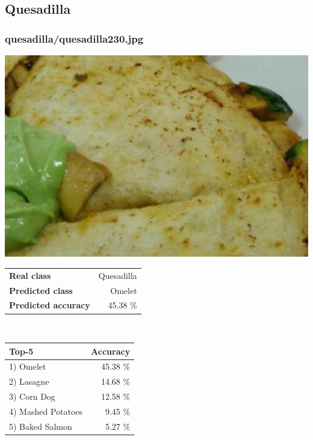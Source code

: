 \subsection{Quesadilla}
    
\subsubsection{quesadilla/quesadilla230.jpg}

\begin{minipage}[t]{0.4\textwidth}
	\vspace{0pt}
	\includegraphics[width=\linewidth]{images/evaluation-images/quesadilla/quesadilla230.jpg}
\end{minipage}
\hfill
\begin{minipage}[t]{0.5\textwidth}
	\vspace{0pt}\raggedright
	\begin{tabularx}{\textwidth}{X r}
		\small \textbf{Real class} & \small Quesadilla\\
		\small \textbf{Predicted class} & \small Omelet\\
		\small \textbf{Predicted accuracy} & \small 45.38 \%
    \end{tabularx}\\
    
    \vspace{6pt}
	\begin{tabularx}{\textwidth}{X r}
        \small \textbf{Top-5} & \small \textbf{Accuracy} \\
        \hline
		\small 1) Omelet & \small 45.38 \%\\\small 2) Lasagne & \small 14.68 \%\\\small 3) Corn Dog & \small 12.58 \%\\\small 4) Mashed Potatoes & \small 9.45 \%\\\small 5) Baked Salmon & \small 5.27 \%
    \end{tabularx}
\end{minipage}
    
